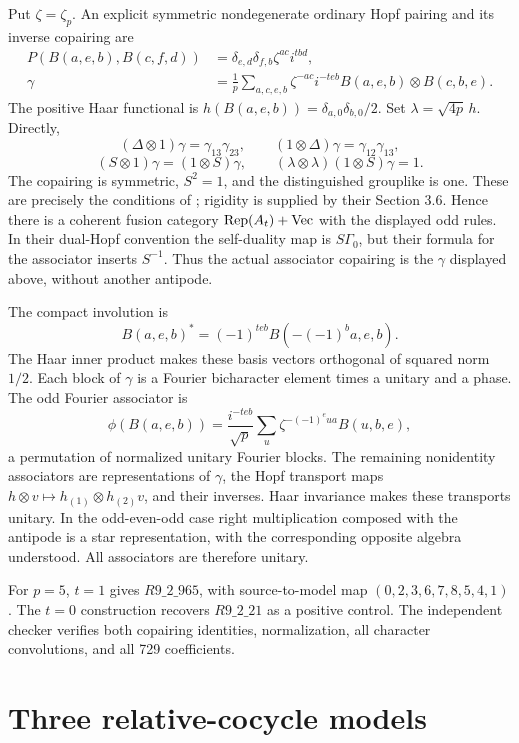 \documentclass[11pt,a4paper]{article}
\theoremstyle{remark}\newtheorem{remark}[theorem]{Remark}
\renewcommand{\Vec}{\operatorname{Vec}}\newcommand{\Irr}{\operatorname{Irr}}
\begin{document}
Put $\zeta=\zeta_p$. An explicit symmetric nondegenerate ordinary Hopf
pairing and its inverse copairing are
\begin{align*}
 P(B(a,e,b),B(c,f,d))&=\delta_{e,d}\delta_{f,b}\zeta^{ac}i^{tbd},\\
 \gamma&=\frac1p\sum_{a,c,e,b}\zeta^{-ac}i^{-teb}
 B(a,e,b)\otimes B(c,b,e).
\end{align*}
The positive Haar functional is
$h(B(a,e,b))=\delta_{a,0}\delta_{b,0}/2$.
Set $\lambda=\sqrt{4p}\,h$. Directly,
\[
 (\Delta\otimes1)\gamma=\gamma_{13}\gamma_{23},\qquad
 (1\otimes\Delta)\gamma=\gamma_{12}\gamma_{13},
\]
\[
 (S\otimes1)\gamma=(1\otimes S)\gamma,\qquad
 (\lambda\otimes\lambda)(1\otimes S)\gamma=1.
\]
The copairing is symmetric, $S^2=1$, and the distinguished grouplike is one.
These are precisely the conditions of \cite[Corollary 3.19]{DR}; rigidity
is supplied by their Section 3.6. Hence there is a coherent fusion category
$\Rep(A_t)+\Vec$ with the displayed odd rules. In their dual-Hopf
convention the self-duality map is $S\Gamma_0$, but their formula for the
associator inserts $S^{-1}$. Thus the actual associator copairing is the
$\gamma$ displayed above, without another antipode.

The compact involution is
\[
 B(a,e,b)^*=(-1)^{teb}B(-(-1)^ba,e,b).
\]
The Haar inner product makes these basis vectors orthogonal of squared
norm $1/2$. Each block of $\gamma$ is a Fourier bicharacter element times
a unitary and a phase. The odd Fourier associator is
\[
 \phi(B(a,e,b))=\frac{i^{-teb}}{\sqrt p}
 \sum_u\zeta^{-(-1)^eua}B(u,b,e),
\]
a permutation of normalized unitary Fourier blocks. The remaining
nonidentity associators are representations of $\gamma$, the Hopf
transport maps $h\otimes v\mapsto h_{(1)}\otimes h_{(2)}v$, and their
inverses. Haar invariance makes these transports unitary. In the odd-even-odd
case right multiplication composed with the antipode is a star
representation, with the corresponding opposite algebra understood.
All associators are therefore unitary.

For $p=5$, $t=1$ gives $R9\_2\_965$, with source-to-model map
$(0,2,3,6,7,8,5,4,1)$. The $t=0$ construction recovers $R9\_2\_21$ as a
positive control. The independent checker verifies both copairing identities,
normalization, all character convolutions, and all 729 coefficients.

\section{Three relative-cocycle models}
\end{document}
